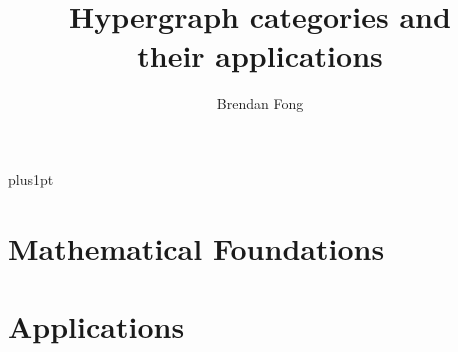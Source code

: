 \documentclass[12pt]{ociamthesis}
\title{Hypergraph categories and \\ their applications}   %
\author{Brendan Fong}
\begin{document}
\baselineskip=18pt plus1pt
\setcounter{secnumdepth}{3} %
\setcounter{tocdepth}{3}

\maketitle                 
 
  
 

\begin{romanpages} 
\tableofcontents


\end{romanpages}

\part{Mathematical Foundations}





\part{Applications}



%

{}

\end{document}
